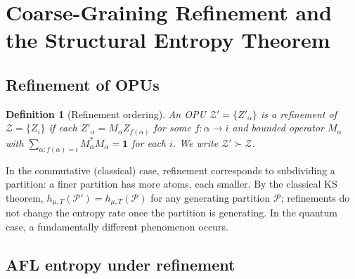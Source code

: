 \documentclass[12pt,a4paper]{article}
\newtheorem{definition}[theorem]{Definition}
\begin{document}
\section{Coarse-Graining Refinement and the Structural Entropy Theorem}
\label{sec:refinement}

\subsection{Refinement of OPUs}

\begin{definition}[Refinement ordering]\label{def:refinement}
An OPU $\mathcal{Z}'=\{Z'_\alpha\}$ is a \emph{refinement} of
$\mathcal{Z}=\{Z_i\}$ if each $Z'_\alpha=M_\alpha Z_{f(\alpha)}$ for some
$f:\alpha\to i$ and bounded operator $M_\alpha$ with $\sum_{\alpha:f(\alpha)=i}
M_\alpha^*M_\alpha=\mathbf{1}$ for each $i$.  We write $\mathcal{Z}'\succ\mathcal{Z}$.
\end{definition}

In the commutative (classical) case, refinement corresponds to subdividing a
partition: a finer partition has more atoms, each smaller.  By the classical
KS theorem, $h_{\mu,T}(\mathcal{P}')=h_{\mu,T}(\mathcal{P})$ for any generating
partition $\mathcal{P}$; refinements do not change the entropy rate once the
partition is generating.  In the quantum case, a fundamentally different
phenomenon occurs.

\subsection{AFL entropy under refinement}
\end{document}
